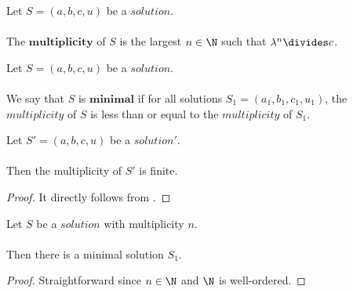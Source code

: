 \begin{definition}
  \label{def:Solution_Multiplicity}
  \leanok
  Let $S=(a, b, c, u)$ be a $solution$. \\\\
  The $\boldsymbol{multiplicity}$ of $S$ is the largest $n \in \N$ such that
  $\lambda^n \divides c$.
\end{definition}

\begin{definition}
  \label{def:Solution_Minimal}
  \leanok
  Let $S=(a, b, c, u)$ be a $solution$. \\\\
  We say that $S$ is $\boldsymbol{minimal}$ if for all solutions $S_1=(a_1,b_1,c_1,u_1)$,
  the $multiplicity$ of $S$ is less than or equal to the $multiplicity$ of $S_1$.
\end{definition}

\begin{lemma}
  \label{lmm:multiplicity_lambda_c_finite}
  \leanok
  Let $S'=(a, b, c, u)$ be a $solution'$. \\\\
  Then the multiplicity of $S'$ is finite.
\end{lemma}
\begin{proof}
  \leanok
  It directly follows from .
\end{proof}

\begin{lemma}
  \label{lmm:exists_minimal}
  \leanok
  Let $S$ be a $solution$ with multiplicity $n$. \\\\
  Then there is a minimal solution $S_1$.
\end{lemma}
\begin{proof}
  \leanok
  Straightforward since $n \in \N$ and $\N$ is well-ordered.
\end{proof}

